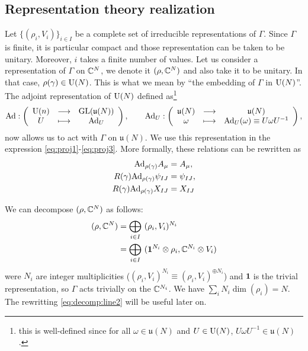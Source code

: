     \subsection{Representation theory realization}

        Let $\{(\rho_i,V_i)\}_{i\in I}$ be a complete set of irreducible representations of $\Gamma$. Since $\Gamma$ is finite, it is particular compact and those representation can be taken to be unitary. Moreover, $i$ takes a finite number of values. Let us consider a representation of $\Gamma$ on $\mathbb{C}^N$, we denote it $(\rho,\mathbb{C}^N)$ and also take it to be unitary. In that case, $\rho(\gamma)\in\text{U}(N)$. This is what we mean by ``the embedding of $\Gamma$ in $\text{U}(N)$''. The adjoint representation of $\text{U}(N)$ defined as\footnote{this is well-defined since for all $\omega\in\mathfrak{u}(N)$ and $U\in\text{U}(N)$, $U\omega U^{-1}\in\mathfrak{u}(N)$.}
        \begin{equation}
            \text{Ad}:\left(
            \begin{array}{ccc}
                \text{U}(n) & \longrightarrow & \text{GL}(\mathfrak{u}(N)) \\
                U & \longmapsto & \text{Ad}_U
            \end{array}
            \right),\qquad
            \text{Ad}_U:\left(
            \begin{array}{ccc}
                \mathfrak{u}(N) & \longrightarrow & \mathfrak{u}(N) \\
                \omega & \longmapsto & \text{Ad}_U(\omega)\equiv U\omega U^{-1}
            \end{array}
            \right),
        \end{equation}
        now allows us to act with $\Gamma$ on $\mathfrak{u}(N)$. We use this representation in the expression \eqref{eq:proj1}-\eqref{eq:proj3}. More formally, these relations can be rewritten as
        \begin{align}
            \text{Ad}_{\rho(\gamma)}A_\mu  &= A_\mu,\label{eq:proj1}\\
            R(\gamma)\text{Ad}_{\rho(\gamma)}\psi_{IJ}  &= \psi_{IJ}\label{eq:proj2},\\
            R(\gamma)\text{Ad}_{\rho(\gamma)}X_{IJ} &= X_{IJ}\label{eq:proj3}
        \end{align}
        

        We can decompose $(\rho,\mathbb{C}^N)$ as follows:
        \begin{align}
            (\rho,\mathbb{C}^N) &= \bigoplus_{i\in I}~(\rho_i,V_i)^{N_i} \\
            &= \bigoplus_{i\in I}~(\boldsymbol{1}^{N_i}\otimes\rho_i,\mathbb{C}^{N_i}\otimes V_i) \label{eq:decomp:line2}
        \end{align}
        were $N_i$ are integer multiplicities ($(\rho_i,V_i)^{N_i}\equiv(\rho_i,V_i)^{\oplus N_i}$) and $\boldsymbol{1}$ is the trivial representation, so $\Gamma$ acts trivially on the $\mathbb{C}^{N_i}$. We have $\sum_iN_i\dim(\rho_i)=N$. The rewritting \eqref{eq:decomp:line2} will be useful later on.
        
